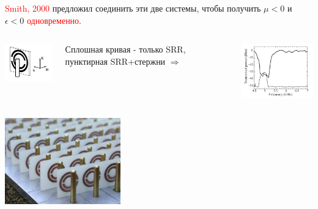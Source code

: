 \documentclass[9pt, compress, xcolor=table]{beamer}
\begin{document}
\begin{frame}{}

 \textcolor{red}{Smith, 2000} предложил соединить эти две системы, чтобы получить $\mu
< 0$ и $\epsilon < 0$ \textcolor{red}{одновременно}.
\begin{columns}[c]
\column{6cm}
\begin{center}
\includegraphics[width=3cm]{neg_ref_7}
\end{center}
Сплошная кривая - только SRR, пунктирная SRR+стержни $\Rightarrow$
\column{6cm}
\begin{center}
\includegraphics[width=4.5cm]{neg_ref_8}
\end{center}
\end{columns}
\begin{center}
\includegraphics[width=5cm]{neg_ref_21}
\end{center}

\end{frame}
\end{document}
